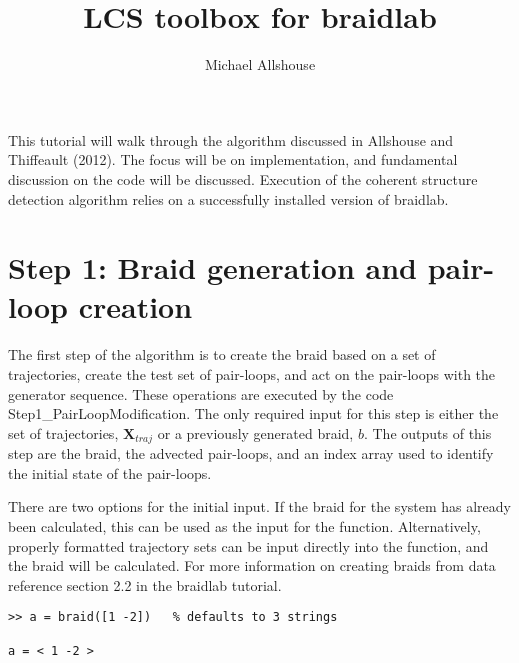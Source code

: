 \documentclass[12pt]{article}
\begin{document}
\lstset{language=Matlab}
\lstset{breaklines=true}

\lstset{%
basicstyle=\small\ttfamily,
keywordstyle=\small\ttfamily,
identifierstyle=,
commentstyle=\small\rmfamily\itshape,%
stringstyle=\small\ttfamily,
showstringspaces=false}


\title{LCS toolbox for braidlab}
\author{Michael Allshouse}
\date{}
\maketitle

This tutorial will walk through the algorithm discussed in Allshouse and Thiffeault (2012).  The focus will be on implementation, and fundamental discussion on the code will be discussed.  Execution of the coherent structure detection algorithm relies on a successfully installed version of braidlab.

\section{Step 1: Braid generation and pair-loop creation}

The first step of the algorithm is to create the braid based on a set of trajectories, create the test set of pair-loops, and act on the pair-loops with the generator sequence.  These operations are executed by the code Step1_PairLoopModification.  The only required input for this step is either the set of trajectories, $\bm{X}_{traj}$ or a previously generated braid, $b$.  The outputs of this step are the braid, the advected pair-loops, and an index array used to identify the initial state of the pair-loops.

There are two options for the initial input.  If the braid for the system has already been calculated, this can be used as the input for the function.  Alternatively, properly formatted trajectory sets can be input directly into the function, and the braid will be calculated.  For more information on creating braids from data reference section 2.2 in the braidlab tutorial.






\begin{lstlisting}[frame=single,framerule=0pt]
>> a = braid([1 -2])   % defaults to 3 strings

a = < 1 -2 >
\end{lstlisting}



\end{document}
